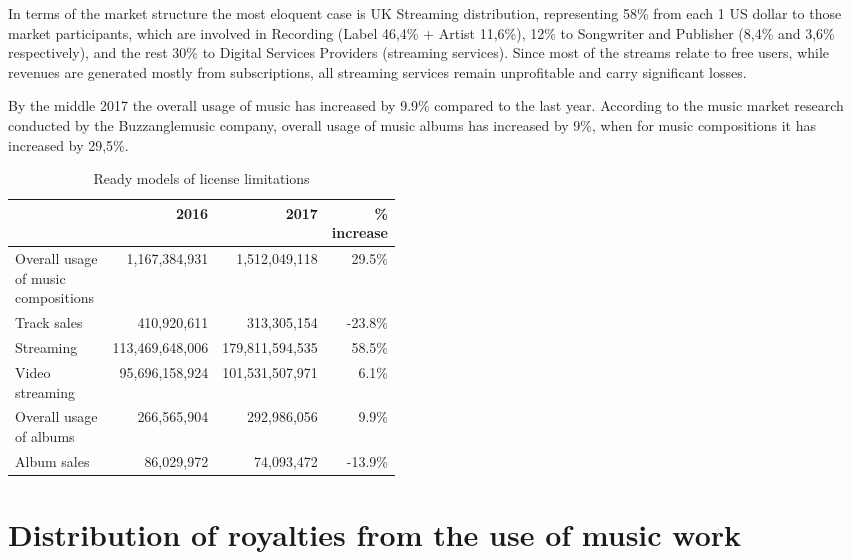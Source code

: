 \documentclass[12pt]{report}
\def\code#1{\colorbox{light-gray}{\texttt{#1}}}
\begin{document}
\begin{multicols}{2}
In terms of the market structure the most eloquent case is UK Streaming distribution, representing 58\% from each 1 US dollar to those market participants, which are involved in Recording (Label 46,4\% + Artist 11,6\%), 12\% to Songwriter and Publisher (8,4\% and 3,6\% respectively), and the rest 30\% to Digital Services Providers (streaming services). Since most of the streams relate to free users, while revenues are generated mostly from subscriptions, all streaming services remain unprofitable and carry significant losses.  
 
By the middle 2017 the overall usage of music has increased by 9.9\% compared to the last year.
According to the music market research conducted by the Buzzanglemusic company, overall usage of music albums has increased by 9\%, when for music compositions it has increased by 29,5\%.

\end{multicols}

\def\Prev{2016}
\def\Current{2017}
\def\Grow{\% increase}
\def\Summary{Overall usage of music compositions}
\def\Sales{Track sales}
\def\Streaming{Streaming}
\def\VideoStreaming{Video streaming}
\def\Albums{Overall usage of albums}
\def\AlbumsSales{Album sales}

\begin{table}[H]
\centering
\caption{Ready models of license limitations}
\begin{tabular}{p{0.45\linewidth}rrr}%
\toprule
& \Prev & \Current & \Grow \\
\toprule
\midrule
\Summary 			& 1,167,384,931 		& 1,512,049,118 		& 29.5\% \\
\Sales 					& 410,920,611 			& 313,305,154 			& -23.8\% \\
\Streaming 			& 113,469,648,006 	& 179,811,594,535 	& 58.5\% \\
\VideoStreaming 	& 95,696,158,924 	& 101,531,507,971		& 6.1\% \\
\Albums 				& 266,565,904 		& 292,986,056 		& 9.9\% \\
\AlbumsSales 		& 86,029,972 			& 74,093,472	 		& -13.9\% \\
\bottomrule
\end{tabular}
\end{table}

\vfill\null\pagebreak
\section{Distribution of royalties from the use of music work}
\label{industry-distribution}
\end{document}
